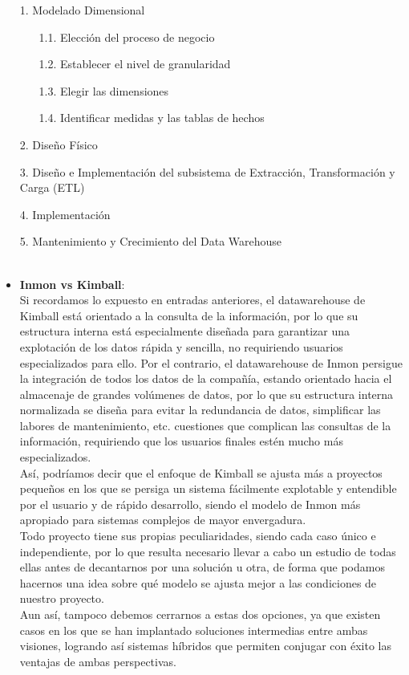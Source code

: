 \documentclass[twoside,twocolumn]{article}
\begin{document}
\begin{enumerate}
\begin{itemize}
\item [1.] Modelado Dimensional
\begin{itemize}
\item [1.1.] Elección del proceso de negocio
\item [1.2.] Establecer el nivel de granularidad
\item [1.3.] Elegir las dimensiones
\item [1.4.] Identificar medidas y las tablas de hechos
\end{itemize}
\item [2.] Diseño Físico
\item [3.] Diseño e Implementación del subsistema de Extracción, Transformación y Carga (ETL)
\item [4.] Implementación
\item [5.] Mantenimiento y Crecimiento del Data Warehouse
\textbf{}\\
\textbf{}\\
\item \textbf{Inmon vs Kimball}: \\

Si recordamos lo expuesto en entradas anteriores, el datawarehouse de Kimball está orientado a la consulta de la información, por lo que su estructura interna está especialmente diseñada para garantizar una explotación de los datos rápida y sencilla, no requiriendo usuarios especializados para ello. Por el contrario, el datawarehouse de Inmon persigue la integración de todos los datos de la compañía, estando orientado hacia el almacenaje de grandes volúmenes de datos, por lo que su estructura interna normalizada se diseña para evitar la redundancia de datos, simplificar las labores de mantenimiento, etc. cuestiones que complican las consultas de la información, requiriendo que los usuarios finales estén mucho más especializados. \\
Así, podríamos decir que el enfoque de Kimball se ajusta más a proyectos pequeños en los que se persiga un sistema fácilmente explotable y entendible por el usuario y de rápido desarrollo, siendo el modelo de Inmon más apropiado para sistemas complejos de mayor envergadura. \\
Todo proyecto tiene sus propias peculiaridades, siendo cada caso único e independiente, por lo que resulta necesario llevar a cabo un estudio de todas ellas antes de decantarnos por una solución u otra, de forma que podamos hacernos una idea sobre qué modelo se ajusta mejor a las condiciones de nuestro proyecto. \\
Aun así, tampoco debemos cerrarnos a estas dos opciones, ya que existen casos en los que se han implantado soluciones intermedias entre ambas visiones, logrando así sistemas híbridos que permiten conjugar con éxito las ventajas de ambas perspectivas. \\

\end{itemize}


	
\end{enumerate}
\end{document}
